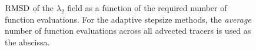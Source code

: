 \begin{figure}[htpb]
    \centering
    
    \caption[$\rmsd$ of the $\lambda_{2}$ field as a function of the required
    number of function evaluations]{
    $\rmsd$ of the $\lambda_{2}$ field as a function of the required number of
    function evaluations. For the adaptive stepsize methods, the \emph{average}
    number of function evaluations across all advected tracers is used as the
    abscissa.}
\label{fig:lmbd2_err_both}
\end{figure}
